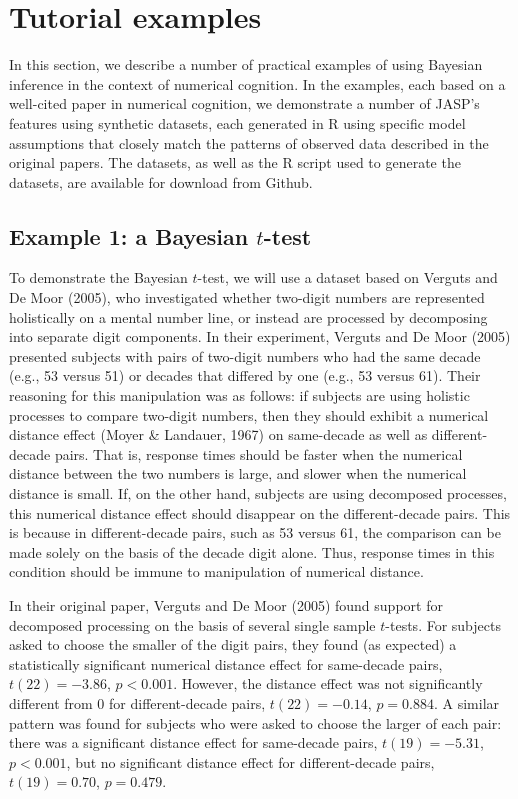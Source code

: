 \documentclass[english,,doc,floatsintext]{apa6}
\begin{document}
\hypertarget{tutorial-examples}{%
\section{Tutorial examples}\label{tutorial-examples}}

In this section, we describe a number of practical examples of using Bayesian inference in the context of numerical cognition. In the examples, each based on a well-cited paper in numerical cognition, we demonstrate a number of JASP's features using synthetic datasets, each generated in R using specific model assumptions that closely match the patterns of observed data described in the original papers. The datasets, as well as the R script used to generate the datasets, are available for download from Github.

\hypertarget{example-1-a-bayesian-t-test}{%
\subsection{\texorpdfstring{Example 1: a Bayesian \(t\)-test}{Example 1: a Bayesian t-test}}\label{example-1-a-bayesian-t-test}}

To demonstrate the Bayesian \(t\)-test, we will use a dataset based on Verguts and De Moor (2005), who investigated whether two-digit numbers are represented holistically on a mental number line, or instead are processed by decomposing into separate digit components. In their experiment, Verguts and De Moor (2005) presented subjects with pairs of two-digit numbers who had the same decade (e.g., 53 versus 51) or decades that differed by one (e.g., 53 versus 61). Their reasoning for this manipulation was as follows: if subjects are using holistic processes to compare two-digit numbers, then they should exhibit a numerical distance effect (Moyer \& Landauer, 1967) on same-decade as well as different-decade pairs. That is, response times should be faster when the numerical distance between the two numbers is large, and slower when the numerical distance is small. If, on the other hand, subjects are using decomposed processes, this numerical distance effect should disappear on the different-decade pairs. This is because in different-decade pairs, such as 53 versus 61, the comparison can be made solely on the basis of the decade digit alone. Thus, response times in this condition should be immune to manipulation of numerical distance.

In their original paper, Verguts and De Moor (2005) found support for decomposed processing on the basis of several single sample \(t\)-tests. For subjects asked to choose the smaller of the digit pairs, they found (as expected) a statistically significant numerical distance effect for same-decade pairs, \(t(22) = -3.86\), \(p<0.001\). However, the distance effect was not significantly different from 0 for different-decade pairs, \(t(22)=-0.14\), \(p=0.884\). A similar pattern was found for subjects who were asked to choose the larger of each pair: there was a significant distance effect for same-decade pairs, \(t(19)=-5.31\), \(p<0.001\), but no significant distance effect for different-decade pairs, \(t(19)=0.70\), \(p=0.479\).
\end{document}
